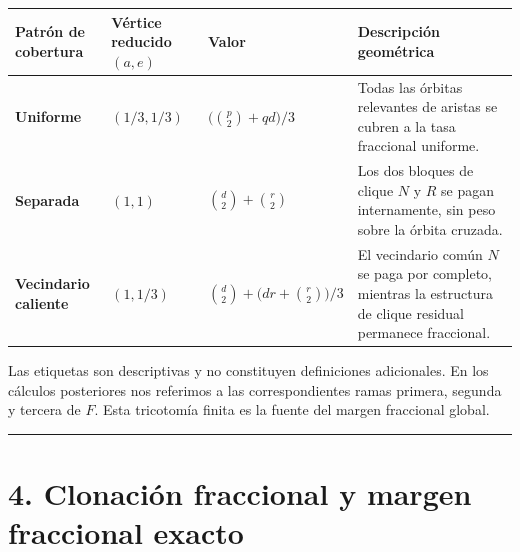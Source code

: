 \documentclass[spanish,11pt,a4paper]{article}
\newcounter{none}
\begin{document}
{\def\LTcaptype{none} %
\begin{longtable}[]{@{}
  >{\raggedright\arraybackslash}p{}
  >{\raggedleft\arraybackslash}p{}
  >{\raggedleft\arraybackslash}p{}
  >{\raggedright\arraybackslash}p{}@{}}
\toprule\noalign{}
\begin{minipage}[b]{\linewidth}\raggedright
Patrón de cobertura
\end{minipage} & \begin{minipage}[b]{\linewidth}\raggedleft
Vértice reducido \((a,e)\)
\end{minipage} & \begin{minipage}[b]{\linewidth}\raggedleft
Valor
\end{minipage} & \begin{minipage}[b]{\linewidth}\raggedright
Descripción geométrica
\end{minipage} \\
\midrule\noalign{}
\endhead
\bottomrule\noalign{}
\endlastfoot
\textbf{Uniforme} & \((1/3,1/3)\) & \(\bigl(\binom p2+qd\bigr)/3\) &
Todas las órbitas relevantes de aristas se cubren a la tasa fraccional
uniforme. \\
\textbf{Separada} & \((1,1)\) & \(\binom d2+\binom r2\) & Los dos
bloques de clique \(N\) y \(R\) se pagan internamente, sin peso sobre la
órbita cruzada. \\
\textbf{Vecindario caliente} & \((1,1/3)\) &
\(\binom d2+\bigl(dr+\binom r2\bigr)/3\) & El vecindario común \(N\) se
paga por completo, mientras la estructura de clique residual permanece
fraccional. \\
\end{longtable}
}

Las etiquetas son descriptivas y no constituyen definiciones
adicionales. En los cálculos posteriores nos referimos a las
correspondientes ramas primera, segunda y tercera de \(F\). Esta
tricotomía finita es la fuente del margen fraccional global.

\begin{center}\rule{0.5\linewidth}{0.5pt}\end{center}

\section{4. Clonación fraccional y margen fraccional
exacto}\label{clonaciuxf3n-fraccional-y-margen-fraccional-exacto}
\end{document}

